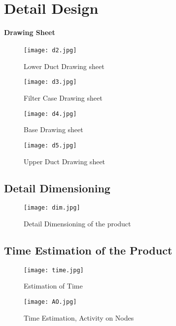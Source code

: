 \documentclass[12pt]{article}
\begin{document}
\newpage

\section{Detail Design}

\paragraph{Drawing Sheet}

\begin{figure}[!htb]
\centering
\texttt{[image: d2.jpg]}
\caption{\label{fig:}Lower Duct Drawing sheet}
\end{figure}

\begin{figure}[!htb]
\centering
\texttt{[image: d3.jpg]}
\caption{\label{fig:}Filter Case Drawing sheet}
\end{figure}

\begin{figure}[!htb]
\centering
\texttt{[image: d4.jpg]}
\caption{\label{fig:}Base Drawing sheet}
\end{figure}

\begin{figure}[!htb]
\centering
\texttt{[image: d5.jpg]}
\caption{\label{fig:}Upper Duct Drawing sheet}
\end{figure}

\newpage

\subsection{Detail Dimensioning}

\begin{figure}[!htb]
\centering
\texttt{[image: dim.jpg]}
\caption{\label{fig:}Detail Dimensioning of the product}
\end{figure}

\newpage

\subsection{Time Estimation of the Product}

\begin{figure}[!htb]
\centering
\texttt{[image: time.jpg]}
\caption{\label{fig:}Estimation of Time}
\end{figure}

\begin{figure}[!htb]
\centering
\texttt{[image: AO.jpg]}
\caption{\label{fig:}Time Estimation, Activity on Nodes}
\end{figure}
\end{document}
